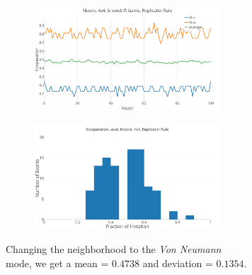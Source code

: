 \documentclass[a4paper, 11pt]{article}
\begin{document}
\begin{figure}[H]
\begin{subfigure}{.55\textwidth}
	\begin{subfigure}{1\textwidth}
		\includegraphics[width=1\linewidth]{SDMoore4x4}
	\end{subfigure}

	\begin{subfigure}{1\textwidth}
		\includegraphics[width=1\linewidth]{SDMoore4x4HG}
	\end{subfigure}
\end{subfigure}%
\begin{subfigure}{.45\textwidth}
	Changing the neighborhood to the \textit{Von Neumann} mode, we get a mean = $0.4738$ and deviation = $0.1354$.
\end{subfigure}

\end{figure}


\newpage
\end{document}
